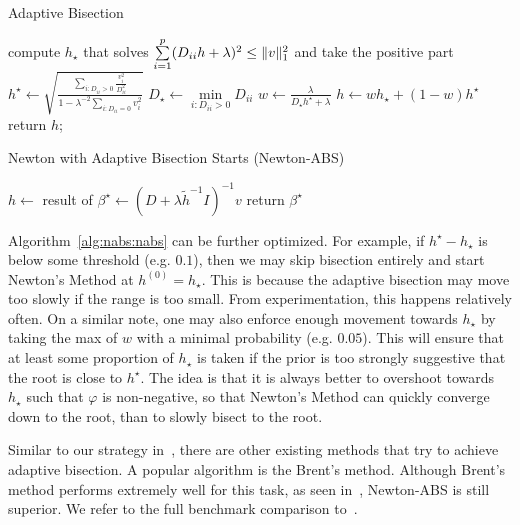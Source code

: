 \begin{algorithm}
    \caption{Adaptive Bisection}\label{alg:nabs:ab}
    compute $h_\star$ that solves
    $
        \sum\limits_{i=1}^p
        (D_{ii} h + \lambda)^2
        \leq
        \|v\|_1^2
    $ and take the positive part\;
    $
        h^\star
        \gets
        \sqrt{
            \frac{
                \sum\limits_{i: D_{ii} > 0} \frac{v_i^2}{D_{ii}^2}
            }{
                1 - \lambda^{-2} \sum\limits_{i : D_{ii} = 0} v_i^2            
            }
        }
    $\;
    $D_\star \gets \min\limits_{i : D_{ii} > 0} D_{ii}$\;
    $w \gets \frac{\lambda}{D_\star h^\star + \lambda}$\;
    $h \gets wh_\star + (1-w)h^\star$\;
    return $h$;
\end{algorithm}

\begin{algorithm}
    \caption{Newton with Adaptive Bisection Starts (Newton-ABS)}\label{alg:nabs:nabs}
    $h \gets$ result of \;
    $\beta^\star \gets (D + \lambda \tilde{h}^{-1} I)^{-1} v$\;
    return $\beta^\star$\;
\end{algorithm}

Algorithm~\ref{alg:nabs:nabs} can be further optimized.
For example, if $h^\star - h_\star$ is below some threshold (e.g. $0.1$),
then we may skip bisection entirely and start Newton's Method at $h^{(0)} = h_\star$.
This is because the adaptive bisection may move too slowly if the range is too small.
From experimentation, this happens relatively often.
On a similar note, one may also enforce enough movement towards $h_\star$
by taking the max of $w$ with a minimal probability (e.g. $0.05$).
This will ensure that at least some proportion of $h_\star$ is taken 
if the prior is too strongly suggestive that the root is close to $h^\star$.
The idea is that it is always better to overshoot towards $h_\star$ such that $\varphi$ is non-negative,
so that Newton's Method can quickly converge down to the root,
than to slowly bisect to the root.

Similar to our strategy in~,
there are other existing methods that try to achieve adaptive bisection.
A popular algorithm is the Brent's method.
Although Brent's method performs extremely well for this task,
as seen in~,
Newton-ABS is still superior.
We refer to the full benchmark comparison to~.
